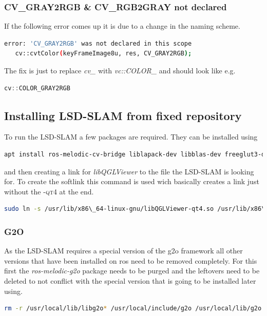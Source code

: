 \subsubsection{CV\_GRAY2RGB \& CV\_RGB2GRAY not declared}
If the following error comes up it is due to a change in the naming scheme.\newline
\begin{lstlisting}[language=bash]
error: 'CV_GRAY2RGB' was not declared in this scope
   cv::cvtColor(keyFrameImage8u, res, CV_GRAY2RGB);
\end{lstlisting}
The fix is just to replace \textit{cv\_} with \textit{vc::COLOR\_} and should look like e.g.  \newline
\begin{lstlisting}[language=C++, caption={Example fix for \'CV\_GRAY2RGB\' \& \'CV\_RGB2GRAY\' not declared}]
cv::COLOR_GRAY2RGB
\end{lstlisting}

\subsection{Installing LSD-SLAM from fixed repository}
To run the LSD-SLAM a few packages are required. They can be installed using\newline
\begin{lstlisting}[language=bash, caption={Installing prerequisites for LSD-SLAM}]
    apt install ros-melodic-cv-bridge liblapack-dev libblas-dev freeglut3-dev libqglviewer-dev-qt4 libsuitesparse-dev libx11-dev
\end{lstlisting}

and then creating a link for \textit{libQGLViewer} to the file the LSD-SLAM is looking for. To create the softlink this command is used wich basically creates a link just without the \textsc{-qt4} at the end.\newline
\begin{lstlisting}[language=bash,caption={Creating softlink for libQGLViewer.so}]
    sudo ln -s /usr/lib/x86\_64-linux-gnu/libQGLViewer-qt4.so /usr/lib/x86\_64-linux-gnu/libQGLViewer.so
\end{lstlisting}

\subsubsection{G2O}\label{ref:g2o}
As the LSD-SLAM requires a special version of the \gls{g2o} framework all other versions that have been installed on \gls{ros} need to be removed completely. For this first the \textit{ros-melodic-g2o} package needs to be purged and the leftovers need to be deleted to not conflict with the special version that is going to be installed later using.\newline
\begin{lstlisting}[language=bash, caption={Removing leftover from \gls{g2o}}]
    rm -r /usr/local/lib/libg2o* /usr/local/include/g2o /usr/local/lib/g2o /usr/local/bin/g2o*
\end{lstlisting}

